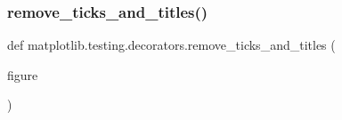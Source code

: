 \subsubsection{\texorpdfstring{remove\+\_\+ticks\+\_\+and\+\_\+titles()}{remove\_ticks\_and\_titles()}}
{\footnotesize\ttfamily def matplotlib.\+testing.\+decorators.\+remove\+\_\+ticks\+\_\+and\+\_\+titles (\begin{DoxyParamCaption}\item[{}]{figure }\end{DoxyParamCaption})}

